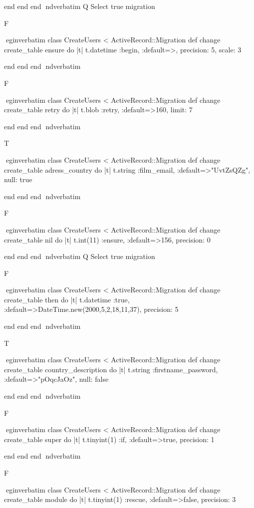     end 
  end 
end
nd{verbatim}
Q
 Select true migration

F

egin{verbatim}
 class CreateUsers < ActiveRecord::Migration 
  def change 
    create_table ensure do |t| 
      t.datetime :begin, :default=>, precision: 5, scale: 3
    
    end 
  end 
end
nd{verbatim}

F

egin{verbatim}
 class CreateUsers < ActiveRecord::Migration 
  def change 
    create_table retry do |t| 
      t.blob :retry, :default=>160, limit: 7
    
    end 
  end 
end
nd{verbatim}

T

egin{verbatim}
 class CreateUsers < ActiveRecord::Migration 
  def change 
    create_table adress_country do |t| 
      t.string :film_email, :default=>"UvtZsQZg", null: true
    
    end 
  end 
end
nd{verbatim}

F

egin{verbatim}
 class CreateUsers < ActiveRecord::Migration 
  def change 
    create_table nil do |t| 
      t.int(11) :ensure, :default=>156, precision: 0
    
    end 
  end 
end
nd{verbatim}
Q
 Select true migration

F

egin{verbatim}
 class CreateUsers < ActiveRecord::Migration 
  def change 
    create_table then do |t| 
      t.datetime :true, :default=>DateTime.new(2000,5,2,18,11,37), precision: 5
    
    end 
  end 
end
nd{verbatim}

T

egin{verbatim}
 class CreateUsers < ActiveRecord::Migration 
  def change 
    create_table country_description do |t| 
      t.string :firstname_password, :default=>"pOqcJaOz", null: false
    
    end 
  end 
end
nd{verbatim}

F

egin{verbatim}
 class CreateUsers < ActiveRecord::Migration 
  def change 
    create_table super do |t| 
      t.tinyint(1) :if, :default=>true, precision: 1
    
    end 
  end 
end
nd{verbatim}

F

egin{verbatim}
 class CreateUsers < ActiveRecord::Migration 
  def change 
    create_table module do |t| 
      t.tinyint(1) :rescue, :default=>false, precision: 3
    
